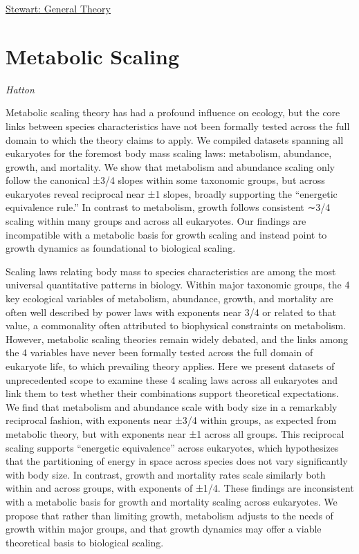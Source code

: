 \documentclass[
]{book}
\begin{document}
\href{https://www.sciencedirect.com/science/article/pii/S030326472030126X}{Stewart: General Theory}

\hypertarget{metabolic-scaling}{%
\section{Metabolic Scaling}\label{metabolic-scaling}}

\emph{Hatton}

Metabolic scaling theory has had a profound influence on ecology, but the core links between species characteristics have not been formally tested across the full domain to which the theory claims to apply. We compiled datasets spanning all eukaryotes for the foremost body mass scaling laws: metabolism, abundance, growth, and mortality. We show that metabolism and abundance scaling only follow the canonical ±3/4 slopes within some taxonomic groups, but across eukaryotes reveal reciprocal near ±1 slopes, broadly supporting the ``energetic equivalence rule.'' In contrast to metabolism, growth follows consistent ∼3/4 scaling within many groups and across all eukaryotes. Our findings are incompatible with a metabolic basis for growth scaling and instead point to growth dynamics as foundational to biological scaling.

Scaling laws relating body mass to species characteristics are among the most universal quantitative patterns in biology. Within major taxonomic groups, the 4 key ecological variables of metabolism, abundance, growth, and mortality are often well described by power laws with exponents near 3/4 or related to that value, a commonality often attributed to biophysical constraints on metabolism. However, metabolic scaling theories remain widely debated, and the links among the 4 variables have never been formally tested across the full domain of eukaryote life, to which prevailing theory applies. Here we present datasets of unprecedented scope to examine these 4 scaling laws across all eukaryotes and link them to test whether their combinations support theoretical expectations. We find that metabolism and abundance scale with body size in a remarkably reciprocal fashion, with exponents near ±3/4 within groups, as expected from metabolic theory, but with exponents near ±1 across all groups. This reciprocal scaling supports ``energetic equivalence'' across eukaryotes, which hypothesizes that the partitioning of energy in space across species does not vary significantly with body size. In contrast, growth and mortality rates scale similarly both within and across groups, with exponents of ±1/4. These findings are inconsistent with a metabolic basis for growth and mortality scaling across eukaryotes. We propose that rather than limiting growth, metabolism adjusts to the needs of growth within major groups, and that growth dynamics may offer a viable theoretical basis to biological scaling.
\end{document}
